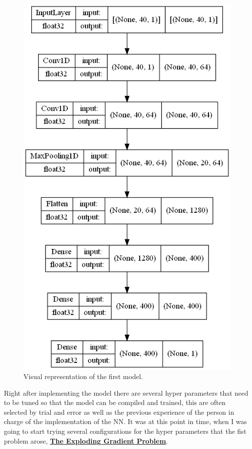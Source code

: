 \documentclass[12pt, a4paper]{article}
\begin{document}
	\begin{figure}[H]
		\centering
		\label{bigM1Squema}
		\includegraphics[scale=0.50]{img/esquemaPequenoM1.png}
		\caption{Visual representation of the first model.}
	\end{figure}
	
	Right after implementing the model there are several hyper parameters that need to be tuned so that the model can be compiled and trained, this are often selected by trial and error as well as the previous experience of the person in charge of the implementation of the NN. It was at this point in time, when I was going to start trying several configurations for the hyper parameters that the fist problem arose, \hyperref[sec:explodingGradientProblem]{\textbf{The Exploding Gradient Problem}}.
	
\end{document}

